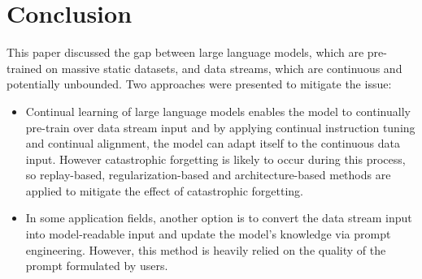 \documentclass[runningheads]{llncs}
\begin{document}
\section{Conclusion}
This paper discussed the gap between large language models, which are pre-trained on massive static datasets, and data streams, which are continuous and potentially unbounded.
Two approaches were presented to mitigate the issue:
\begin{itemize}
  \item Continual learning of large language models enables the model to continually pre-train over data stream input and by applying continual instruction tuning and continual alignment,
the model can adapt itself to the continuous data input. However catastrophic forgetting is likely to occur during this process, so replay-based, regularization-based and architecture-based
methods are applied to mitigate the effect of catastrophic forgetting.
  \item In some application fields, another option is to convert the data stream input into model-readable input and update the model's knowledge via prompt engineering. However, this method is
heavily relied on the quality of the prompt formulated by users.
\end{itemize}
\end{document}

